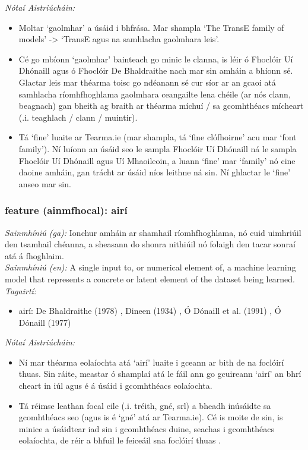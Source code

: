  \noindent \textit{Nótaí Aistriúcháin:}
\begin{itemize}
	\item Moltar `gaolmhar' a úsáid i bhfrása. Mar shampla `The TransE family of models' -> `TransE agus na samhlacha gaolmhara leis'.
	\item Cé go mbíonn `gaolmhar' bainteach go minic le clanna, is léir ó Fhoclóir Uí Dhónaill agus ó Fhoclóir De Bhaldraithe nach mar sin amháin a bhíonn sé. Glactar leis mar théarma toisc go ndéanann sé cur síor ar an gcaoi atá samhlacha ríomhfhoghlama gaolmhara ceangailte lena chéile (ar nós clann, beagnach) gan bheith ag braith ar théarma míchuí / sa gcomhthéacs mícheart (.i. teaghlach / clann / muintir).
	\item Tá `fine' luaite ar Tearma.ie (mar shampla, tá `fine clófhoirne' acu mar `font family'). Ní luíonn an úsáid seo le sampla Fhoclóir Uí Dhónaill ná le sampla Fhoclóir Uí Dhónaill agus Uí Mhaoileoin, a luann `fine' mar `family' nó cine daoine amháin, gan trácht ar úsáid níos leithne ná sin. Ní ghlactar le `fine' anseo mar sin.
\end{itemize}


\subsubsection*{feature (ainmfhocal): airí}
 \noindent \textit{Sainmhíniú (ga):} Ionchur amháin ar shamhail ríomhfhoghlama, nó cuid uimhriúil den tsamhail chéanna, a sheasann do shonra nithiúil nó folaigh den tacar sonraí atá á fhoghlaim.
\\
 \noindent \textit{Sainmhíniú (en):} A single input to, or numerical element of, a machine learning model that represents a concrete or latent element of the dataset being learned.
\\
 \noindent \textit{Tagairtí:}
\begin{itemize}
	\item airí: De Bhaldraithe (1978) \cite{de-bhaldraithe}, Dineen (1934) \cite{dineen}, Ó Dónaill et al. (1991) \cite{focloir-beag}, Ó Dónaill (1977) \cite{odonaill}
\end{itemize}

 \noindent \textit{Nótaí Aistriúcháin:}
\begin{itemize}
	\item Ní mar théarma eolaíochta atá `airí' luaite i gceann ar bith de na foclóirí thuas. Sin ráite, meastar ó shamplaí atá le fáil ann go gcuireann `airí' an bhrí cheart in iúl agus é á úsáid i gcomhthéacs eolaíochta.
	\item Tá réimse leathan focal eile (.i. tréith, gné, srl) a bheadh inúsáidte sa gcomhthéacs seo (agus is é `gné' atá ar Tearma.ie). Cé is moite de sin, is minice a úsáidtear iad sin i gcomhthéacs duine, seachas i gcomhthéacs eolaíochta, de réir a bhfuil le feiceáil sna foclóirí thuas .
\end{itemize}


